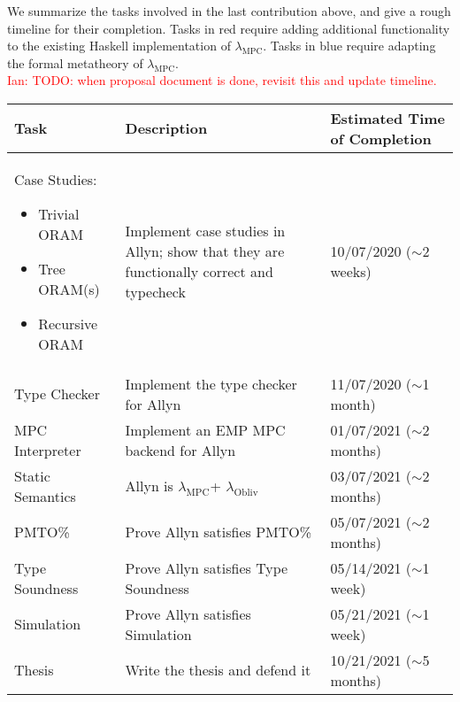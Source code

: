 \documentclass{report}
\newcommand{\lang}{Allyn\xspace}
\newcommand{\mpc}{\ensuremath{\lambda_{\mathrm{MPC}}}\xspace}
\newcommand{\obliv}{\ensuremath{\lambda_{\mathrm{Obliv}}}\xspace}
\newcommand{\ins}[1]{\textcolor{red}{Ian: #1}}
\begin{document}
We summarize the tasks involved in the last contribution above, and give a rough timeline for their completion. Tasks in
\colorbox{implColor}{red} require adding additional functionality to the existing Haskell implementation of \mpc.
Tasks in \colorbox{theoryColor}{blue} require adapting the formal metatheory of \mpc. \\

\ins{TODO: when proposal document is done, revisit this and update timeline.}

\begin{tabular}{|p{}|p{}|p{}|}
  \hline
  \textbf{Task} & \textbf{Description} & \textbf{Estimated Time of Completion} \\
  \hline
  \rowcolor{implColor}
  Case Studies:
  \begin{itemize}
  \item Trivial ORAM
  \item Tree ORAM(s)
  \item Recursive ORAM
  \end{itemize}    & Implement case studies in \lang;
  show that they are functionally correct and typecheck & 10/07/2020 ($\sim$2 weeks)  \\ \hline
  \rowcolor{implColor}
  Type Checker     & Implement the type checker for \lang                  & 11/07/2020 ($\sim$1 month)  \\ \hline
  \rowcolor{implColor}
  MPC Interpreter  & Implement an EMP MPC backend for \lang                & 01/07/2021 ($\sim$2 months) \\ \hline
  \rowcolor{theoryColor}
  Static Semantics & \lang is \mpc + \obliv                                & 03/07/2021 ($\sim$2 months) \\ \hline
  \rowcolor{theoryColor}
  PMTO\%           & Prove \lang satisfies PMTO\%                          & 05/07/2021 ($\sim$2 months) \\ \hline
  \rowcolor{theoryColor}
  Type Soundness   & Prove \lang satisfies Type Soundness                  & 05/14/2021 ($\sim$1 week)   \\ \hline
  \rowcolor{theoryColor}
  Simulation       & Prove \lang satisfies Simulation                      & 05/21/2021 ($\sim$1 week)   \\ \hline
  Thesis           & Write the thesis and defend it                        & 10/21/2021 ($\sim$5 months) \\ \hline
\end{tabular}
\end{document}
